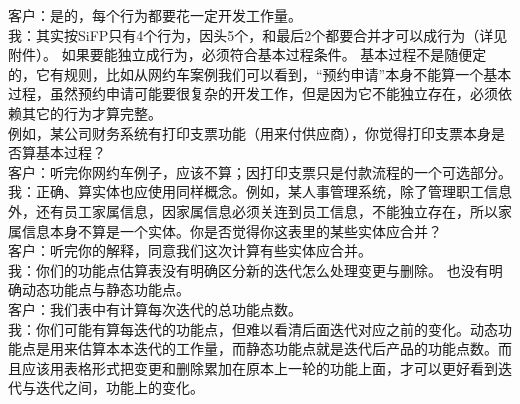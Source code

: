 {\begin{minipage}[t]{0.97\columnwidth}
客户：是的，每个行为都要花一定开发工作量。\\
我：其实按SiFP只有4个行为，因头5个，和最后2个都要合并才可以成行为（详见附件）。
如果要能独立成行为，必须符合基本过程条件。
基本过程不是随便定的，它有规则，比如从网约车案例我们可以看到，``预约申请''本身不能算一个基本过程，虽然预约申请可能要很复杂的开发工作，但是因为它不能独立存在，必须依赖其它的行为才算完整。\\
例如，某公司财务系统有打印支票功能（用来付供应商），你觉得打印支票本身是否算基本过程？\\
客户：听完你网约车例子，应该不算；因打印支票只是付款流程的一个可选部分。\\
我：正确、算实体也应使用同样概念。例如，某人事管理系统，除了管理职工信息外，还有员工家属信息，因家属信息必须关连到员工信息，不能独立存在，所以家属信息本身不算是一个实体。你是否觉得你这表里的某些实体应合并？\\
客户：听完你的解释，同意我们这次计算有些实体应合并。\\
我：你们的功能点估算表没有明确区分新的迭代怎么处理变更与删除。
也没有明确动态功能点与静态功能点。\\
客户：我们表中有计算每次迭代的总功能点数。\\
我：你们可能有算每迭代的功能点，但难以看清后面迭代对应之前的变化。动态功能点是用来估算本本迭代的工作量，而静态功能点就是迭代后产品的功能点数。而且应该用表格形式把变更和删除累加在原本上一轮的功能上面，才可以更好看到迭代与迭代之间，功能上的变化。\strut
\end{minipage}}


